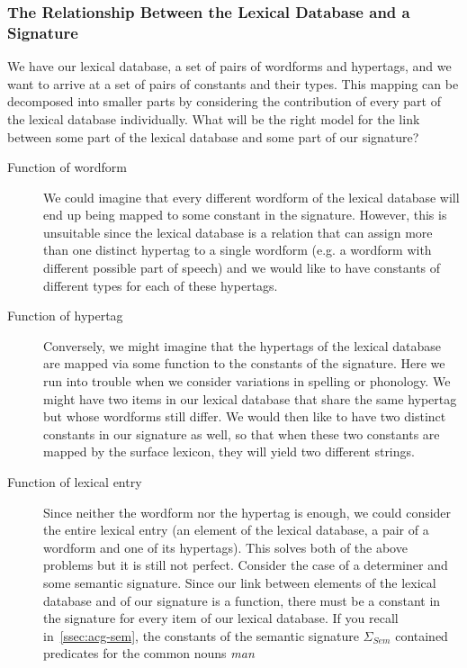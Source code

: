 \subsubsection{The Relationship Between the Lexical Database and a Signature}

We have our lexical database, a set of pairs of wordforms and hypertags,
and we want to arrive at a set of pairs of constants and their
types. This mapping can be decomposed into smaller parts by considering
the contribution of every part of the lexical database
individually. What will be the right model for the link between some
part of the lexical database and some part of our signature?

\begin{description}
  \item[Function of wordform] We could imagine that every different
    wordform of the lexical database will end up being mapped to some
    constant in the signature. However, this is unsuitable since the
    lexical database is a relation that can assign more than one
    distinct hypertag to a single wordform (e.g. a wordform with
    different possible part of speech) and we would like to have
    constants of different types for each of these hypertags.
  \item[Function of hypertag] Conversely, we might imagine that the
    hypertags of the lexical database are mapped via some function to
    the constants of the signature. Here we run into trouble when we
    consider variations in spelling or phonology. We might have two
    items in our lexical database that share the same hypertag but whose
    wordforms still differ. We would then like to have two distinct
    constants in our signature as well, so that when these two constants
    are mapped by the surface lexicon, they will yield two different
    strings.
  \item[Function of lexical entry] Since neither the wordform nor the
    hypertag is enough, we could consider the entire lexical entry (an
    element of the lexical database, a pair of a wordform and one of its
    hypertags). This solves both of the above problems but it is still
    not perfect. Consider the case of a determiner and some semantic
    signature. Since our link between elements of the lexical database
    and of our signature is a function, there must be a constant in the
    signature for every item of our lexical database. If you recall
    in~\ref{ssec:acg-sem}, the constants of the semantic signature
    $\Sigma_{Sem}$ contained predicates for the common nouns \emph{man}

\end{description}
